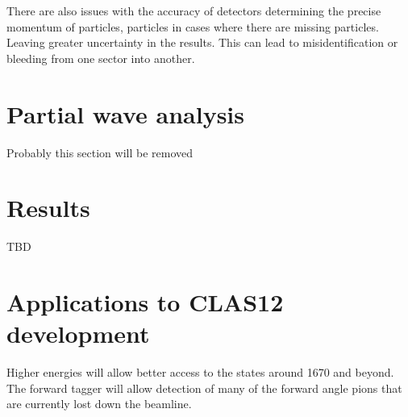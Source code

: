There are also issues with the accuracy of detectors determining the precise momentum of particles, particles in cases where there are missing particles. Leaving greater uncertainty in the results. This can lead to misidentification or bleeding from one sector into another.

\section{Partial wave analysis}
Probably this section will be removed
\section{Results}
TBD

\section{Applications to CLAS12 development}

Higher energies will allow better access to the states around 1670 and beyond.
The forward tagger will allow detection of many of the forward angle pions that are currently lost down the beamline.